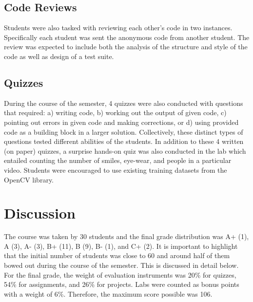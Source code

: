 \documentclass[letterpaper,twocolumn,10pt]{article}
\begin{document}
\subsection{Code Reviews}
Students were also tasked with reviewing each other's code in two instances.
Specifically each student was sent the anonymous code from another student. The
review was expected to include both the analysis of the structure and style of
the code as well as design of a test suite.

\subsection{Quizzes}
During the course of the semester, 4 quizzes were also conducted with questions
that required: a) writing code, b) working out the output of given code, c)
pointing out errors in given code and making corrections, or d) using provided
code as a building block in a larger solution. Collectively, these distinct
types of questions tested different abilities of the students. In addition to
these 4 written (on paper) quizzes, a surprise hands-on quiz was also conducted
in the lab which entailed counting the number of smiles, eye-wear, and people in
a particular video. Students were encouraged to use existing training datasets
from the OpenCV library.

\section{Discussion}\label{sec:discussion}
The course was taken by 30 students and the final grade distribution was A+ (1),
A (3), A- (3), B+ (11), B (9), B- (1), and C+ (2). It is important to highlight
that the initial number of students was close to 60 and around half of them
bowed out during the course of the semester. This is discussed in detail below.
For the final grade, the weight of evaluation instruments was 20\% for quizzes,
54\% for assignments, and 26\% for projects. Labs were counted as bonus points
with a weight of 6\%. Therefore, the maximum score possible was 106.
\end{document}
